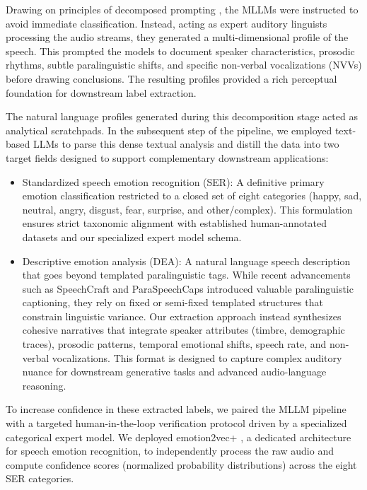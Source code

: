 Drawing on principles of decomposed prompting \cite{khot2022decomposed}, the MLLMs were instructed to avoid immediate classification. Instead, acting as expert auditory linguists processing the audio streams, they generated a multi-dimensional profile of the speech. This prompted the models to document speaker characteristics, prosodic rhythms, subtle paralinguistic shifts, and specific non-verbal vocalizations (NVVs) before drawing conclusions. The resulting profiles provided a rich perceptual foundation for downstream label extraction.

The natural language profiles generated during this decomposition stage acted as analytical scratchpads. In the subsequent step of the pipeline, we employed text-based LLMs to parse this dense textual analysis and distill the data into two target fields designed to support complementary downstream applications:
\begin{itemize}
    \item Standardized speech emotion recognition (SER): A definitive primary emotion classification restricted to a closed set of eight categories (happy, sad, neutral, angry, disgust, fear, surprise, and other/complex). This formulation ensures strict taxonomic alignment with established human-annotated datasets and our specialized expert model schema.
    \item Descriptive emotion analysis (DEA): A natural language speech description that goes beyond templated paralinguistic tags. While recent advancements such as SpeechCraft \cite{SpeechCraft} and ParaSpeechCaps \cite{ParaSpeechCaps} introduced valuable paralinguistic captioning, they rely on fixed or semi-fixed templated structures that constrain linguistic variance. Our extraction approach instead synthesizes cohesive narratives that integrate speaker attributes (\eg timbre, demographic traces), prosodic patterns, temporal emotional shifts, speech rate, and non-verbal vocalizations. This format is designed to capture complex auditory nuance for downstream generative tasks and advanced audio-language reasoning.
\end{itemize}

To increase confidence in these extracted labels, we paired the MLLM pipeline with a targeted human-in-the-loop verification protocol driven by a specialized categorical expert model. We deployed emotion2vec+ \cite{emotion2vec}, a dedicated architecture for speech emotion recognition, to independently process the raw audio and compute confidence scores (normalized probability distributions) across the eight SER categories.

